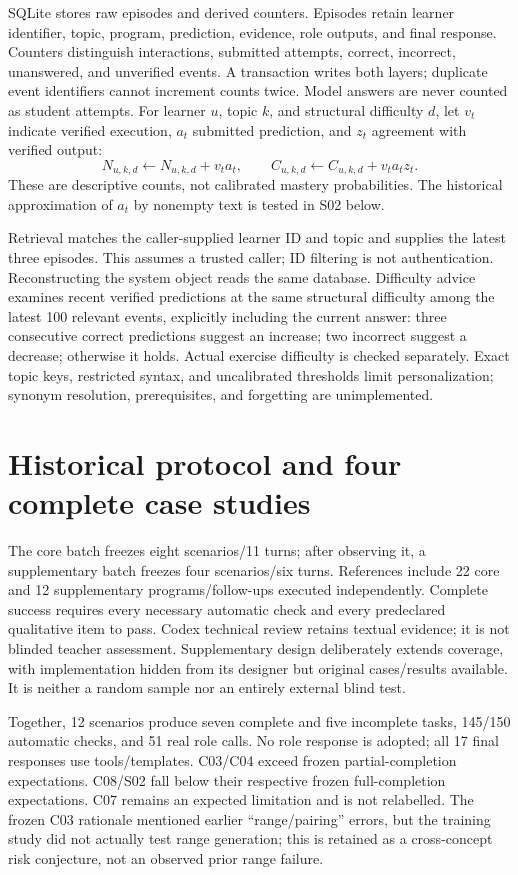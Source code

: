 SQLite stores raw episodes and derived counters. Episodes retain learner identifier, topic, program, prediction, evidence, role outputs, and final response. Counters distinguish interactions, submitted attempts, correct, incorrect, unanswered, and unverified events. A transaction writes both layers; duplicate event identifiers cannot increment counts twice. Model answers are never counted as student attempts. For learner $u$, topic $k$, and structural difficulty $d$, let $v_t$ indicate verified execution, $a_t$ submitted prediction, and $z_t$ agreement with verified output:
\begin{equation}
N_{u,k,d}\leftarrow N_{u,k,d}+v_ta_t,\qquad
C_{u,k,d}\leftarrow C_{u,k,d}+v_ta_tz_t.
\end{equation}
These are descriptive counts, not calibrated mastery probabilities. The historical approximation of $a_t$ by nonempty text is tested in S02 below.

Retrieval matches the caller-supplied learner ID and topic and supplies the latest three episodes. This assumes a trusted caller; ID filtering is not authentication. Reconstructing the system object reads the same database. Difficulty advice examines recent verified predictions at the same structural difficulty among the latest 100 relevant events, explicitly including the current answer: three consecutive correct predictions suggest an increase; two incorrect suggest a decrease; otherwise it holds. Actual exercise difficulty is checked separately. Exact topic keys, restricted syntax, and uncalibrated thresholds limit personalization; synonym resolution, prerequisites, and forgetting are unimplemented.

\section{Historical protocol and four complete case studies}
The core batch freezes eight scenarios/11 turns; after observing it, a supplementary batch freezes four scenarios/six turns. References include 22 core and 12 supplementary programs/follow-ups executed independently. Complete success requires every necessary automatic check and every predeclared qualitative item to pass. Codex technical review retains textual evidence; it is not blinded teacher assessment. Supplementary design deliberately extends coverage, with implementation hidden from its designer but original cases/results available. It is neither a random sample nor an entirely external blind test.

Together, 12 scenarios produce seven complete and five incomplete tasks, 145/150 automatic checks, and 51 real role calls. No role response is adopted; all 17 final responses use tools/templates. C03/C04 exceed frozen partial-completion expectations. C08/S02 fall below their respective frozen full-completion expectations. C07 remains an expected limitation and is not relabelled. The frozen C03 rationale mentioned earlier ``range/pairing'' errors, but the training study did not actually test range generation; this is retained as a cross-concept risk conjecture, not an observed prior range failure.

